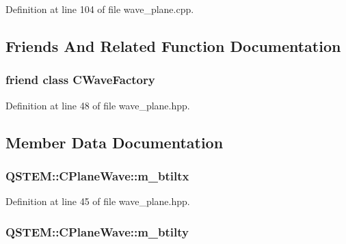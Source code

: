 Definition at line 104 of file wave\-\_\-plane.\-cpp.



\subsection{Friends And Related Function Documentation}
\hypertarget{class_q_s_t_e_m_1_1_c_plane_wave_a414e4fef4e6402acd09bb1f2669428f3}{
\subsubsection[{C\-Wave\-Factory}]{\setlength{\rightskip}{0pt plus 5cm}friend class {\bf C\-Wave\-Factory}\hspace{0.3cm}{\ttfamily [friend]}}}\label{class_q_s_t_e_m_1_1_c_plane_wave_a414e4fef4e6402acd09bb1f2669428f3}


Definition at line 48 of file wave\-\_\-plane.\-hpp.



\subsection{Member Data Documentation}
\hypertarget{class_q_s_t_e_m_1_1_c_plane_wave_a6957cdb11b7953433ae8a5e40483a526}{
\subsubsection[{m\-\_\-btiltx}]{ Q\-S\-T\-E\-M\-::\-C\-Plane\-Wave\-::m\-\_\-btiltx\hspace{0.3cm}{\ttfamily [protected]}}}\label{class_q_s_t_e_m_1_1_c_plane_wave_a6957cdb11b7953433ae8a5e40483a526}


Definition at line 45 of file wave\-\_\-plane.\-hpp.

\hypertarget{class_q_s_t_e_m_1_1_c_plane_wave_ad3a475f7af67a75bf764ecef0609ba26}{
\subsubsection[{m\-\_\-btilty}]{ Q\-S\-T\-E\-M\-::\-C\-Plane\-Wave\-::m\-\_\-btilty\hspace{0.3cm}{\ttfamily [protected]}}}\label{class_q_s_t_e_m_1_1_c_plane_wave_ad3a475f7af67a75bf764ecef0609ba26}


